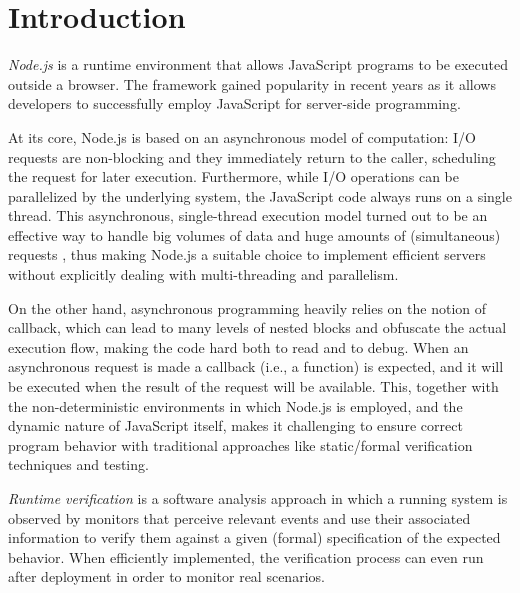 \section{Introduction}
\emph{Node.js} is a runtime environment that allows JavaScript programs to be executed outside a browser.
The framework gained popularity in recent years as it allows developers to successfully employ JavaScript for server-side programming.

At its core, Node.js is based on an asynchronous model of computation: I/O requests are non-blocking and they immediately return to the caller, scheduling the request for later execution.
Furthermore, while I/O operations can be parallelized by the underlying system, the JavaScript code always runs on a single thread.
This asynchronous, single-thread execution model turned out to be an effective way to handle big volumes of data and huge amounts of (simultaneous) requests \cite{Nodejs10,NodejsPerformance14}, thus making Node.js a suitable choice to implement efficient servers without explicitly dealing with multi-threading and parallelism.


%

On the other hand, asynchronous programming heavily relies on the notion of callback, which can lead to many levels of nested blocks and obfuscate the actual execution flow, making the code hard both to read and to debug.
When an asynchronous request is made a callback (i.e., a function) is expected, and it will be executed when the result of the request will be available.
This, together with the non-deterministic environments in which Node.js is employed, and the dynamic nature of JavaScript itself, makes it challenging to ensure correct program behavior with traditional approaches like static/formal verification techniques and testing.

\emph{Runtime verification} \cite{rv} is a software analysis approach in which a running system is observed by monitors that perceive relevant events and use their associated information to verify them against a given (formal) specification of the expected behavior.
When efficiently implemented, the verification process can even run after deployment in order to monitor real scenarios.

